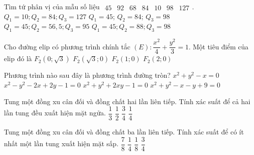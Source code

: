 \begin{ex}%
	Tìm tứ phân vị của mẫu số liệu  $\begin{array}{lllllll}45 & 92 & 68 & 84 & 10 & 98 & 127\end{array}$.
	\choice
	{$Q_1=10 ; Q_2=84 ; Q_3=127$}
	{\True $Q_1=45$; $Q_2=84$; $Q_3=98$}
	{$Q_1=45 ; Q_2=56,5 ; Q_3=95$}
	{$Q_1=45 ; Q_2=88 ; Q_3=98$}
\end{ex}

\begin{ex}%
	Cho đường elip có phương trình chính tắc $(E)\colon\dfrac{x^2}{4}+\dfrac{y^2}{3}=1$. Một tiêu điểm của elip đó là
	\choice
	{$F_2(0 ; \sqrt{3})$}
	{$F_2(\sqrt{3}; 0)$}
	{\True $F_2(1 ; 0)$}
	{$F_2(2 ; 0)$}
\end{ex}

\begin{ex}%
	Phương trình nào sau đây là phương trình đường tròn?
	\choice
	{\True $x^2+y^2-x=0$}
	{$x^2-y^2-2 x+2 y-1=0$}
	{$x^2+y^2+2 x y-1=0$}
	{$x^2+y^2-x-y+9=0$}
\end{ex}

\begin{ex}%
	Tung một đồng xu cân đối và đồng chất hai lần liên tiếp. Tính xác suất để cả hai lần tung đều xuất hiện mặt ngửa.
	\choice
	{$\dfrac{1}{3}$}
	{$\dfrac{1}{2}$}
	{$\dfrac{3}{4}$}
	{\True $\dfrac{1}{4}$}
\end{ex}

\begin{ex}%
	Tung một đồng xu cân đối và đồng chất ba lần liên tiếp. Tính xác suất để có ít nhất một lần tung xuất hiện mặt sấp.
	\choice
	{\True $\dfrac{7}{8}$}
	{$\dfrac{1}{4}$}
	{$\dfrac{1}{8}$}
	{$\dfrac{3}{4}$}
\end{ex}

